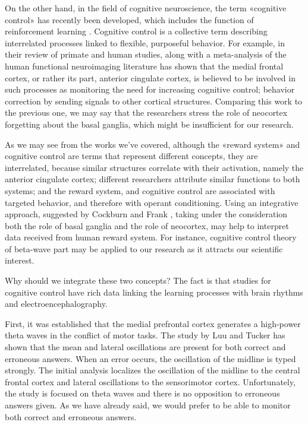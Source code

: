 \documentclass[14pt,a4paper]{scrartcl}
\begin{document}

On the other hand, in the field of cognitive neuroscience, the term «cognitive control» has recently been developed, which includes the function of reinforcement learning \cite{Cockburn2011,Val-Laillet2015}. Cognitive control is a collective term describing interrelated processes linked to flexible, purposeful behavior. For example, \cite{Ridderinkhof2004} in their review of primate and human studies, along with a meta-analysis of the human functional neuroimaging literature has shown that the medial frontal cortex, or rather its part, anterior cingulate cortex, is believed to be involved in such processes as monitoring the need for increasing cognitive control; behavior correction by sending signals to other cortical structures. Comparing this work to the previous one, we may say that the researchers stress the role of neocortex forgetting about the basal ganglia, which might be insufficient for our research.

As we may see from the works we’ve covered, although the «reward system» and cognitive control are terms that represent different concepts, they are interrelated, because similar structures correlate with their activation, namely the anterior cingulate cortex; different researchers attribute similar functions to both systems; and the reward system, and cognitive control are associated with targeted behavior, and therefore with operant conditioning. Using an integrative approach, suggested by Cockburn and Frank \cite{Cockburn2011}, taking under the consideration both the role of basal ganglia and the role of neocortex, may help to interpret data received from human reward system. For instance, cognitive control theory of beta-wave part may be applied to our research as it attracts our scientific interest.

Why should we integrate these two concepts? The fact is that studies for cognitive control have rich data linking the learning processes with brain rhythms and electroencephalography.

First, it was established that the medial prefrontal cortex generates a high-power theta waves in the conflict of motor tasks. The study by Luu and Tucker \cite{Luu2001} has shown that the mean and lateral oscillations are present for both correct and erroneous answers. When an error occurs, the oscillation of the midline is typed strongly. The initial analysis localizes the oscillation of the midline to the central frontal cortex and lateral oscillations to the sensorimotor cortex. Unfortunately, the study is focused on theta waves and there is no opposition to erroneous answers given. As we have already said, we would prefer to be able to monitor both correct and erroneous answers.
\end{document}
